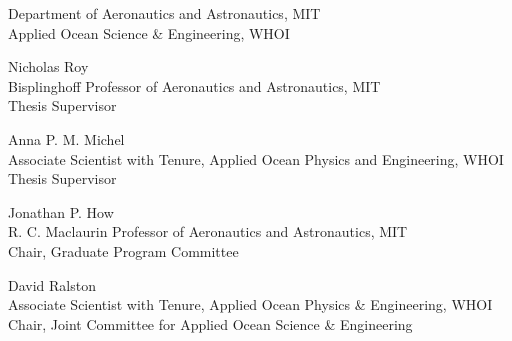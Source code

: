 \begin{titlepage}
\begin{center}
\begin{singlespace}
    \signature{Author}{\footnotesize Department of Aeronautics and Astronautics, MIT \\ Applied Ocean Science \& Engineering, WHOI \\ \@date}
    \vspace{1em}
    \signature{Certified by}{Nicholas Roy \\ \footnotesize Bisplinghoff Professor of Aeronautics and Astronautics, MIT \\ Thesis Supervisor}
    \vspace{1em}
    \signature{Certified by}{Anna P. M. Michel \\ \footnotesize Associate Scientist with Tenure, Applied Ocean Physics and Engineering, WHOI \\ Thesis Supervisor}
    \vspace{1em}
    \signature{Accepted by}{Jonathan P. How \\ \footnotesize R. C. Maclaurin Professor of Aeronautics and Astronautics, MIT \\ Chair, Graduate Program Committee}
    \vspace{1em}
    \signature{Accepted by}{David Ralston \\ \footnotesize Associate Scientist with Tenure, Applied Ocean Physics \& Engineering, WHOI \\ Chair, Joint Committee for Applied Ocean Science \& Engineering}
    \end{singlespace}
  \end{center}
  \makeatother
\end{titlepage}

\newpage
\null
\thispagestyle{empty}
\newpage